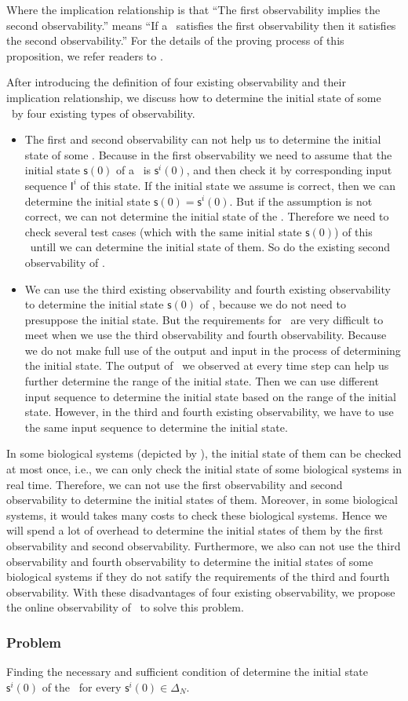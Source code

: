 Where the implication relationship is that ``The first observability implies the second observability.'' means ``If a \BCN\ satisfies the first observability then it satisfies the second observability.'' For the details of the proving process of this proposition, we refer readers to \cite{Zhang2016Observability}.
   
After introducing the definition of four existing observability and their implication relationship, we discuss how to determine the initial state of some \BCNs\ by four existing types of observability. 
\begin{itemize}
\item The first and second observability can not help us to determine the initial state of some \BCNs. Because in the first observability we need to assume that the initial state $\mathsf{s}(0)$ of a \BCN\ is $\mathsf{s}^{i}(0)$, and then check it by corresponding input sequence $\mathsf{I}^{i}$ of this state. If the initial state we assume is correct, then we can determine the initial state $\mathsf{s}(0)=\mathsf{s}^{i}(0)$. But if the assumption is not correct, we can not determine the initial state of the \BCN. Therefore we need to check several test cases (which with the same initial state $\mathsf{s}(0)$) of this \BCN\ untill we can determine the initial state of them. So do the existing second observability of \BCNs.
\item We can use the third existing observability and fourth existing observability to determine the initial state $\mathsf{s}(0)$ of \BCNs, because we do not need to presuppose the initial state. But the requirements for \BCNs\ are very difficult to meet when we use the third observability and fourth observability. Because we do not make full use of the output and input in the process of determining the initial state. The output of \BCNs\ we observed at every time step can help us further determine the range of the initial state. Then we can use different input sequence to determine the initial state based on the range of the initial state. However, in the third and fourth existing observability, we have to use the same input sequence to determine the initial state.
\end{itemize} 
 
In some biological systems (depicted by \BCNs), the initial state of them can be checked at most once, i.e., we can only check the initial state of some biological systems in real time. Therefore, we can not use the first observability and second observability to determine the initial states of them. Moreover, in some biological systems, it would takes many costs to check these biological systems. Hence we will spend a lot of overhead to determine the initial states of them by the first observability and second observability. Furthermore, we also can not use the third observability and fourth observability to determine the initial states of some biological systems if they do not satify the requirements of the third and fourth observability. With these disadvantages of four existing observability, we propose the online observability of \BCNs\ to solve this problem.
 \subsubsection*{Problem}
Finding the necessary and sufficient condition of determine the initial state $\mathsf{s}^{i}(0)$ of the \BCN\ for every $\mathsf{s}^{i}(0)\in\Delta_N$.